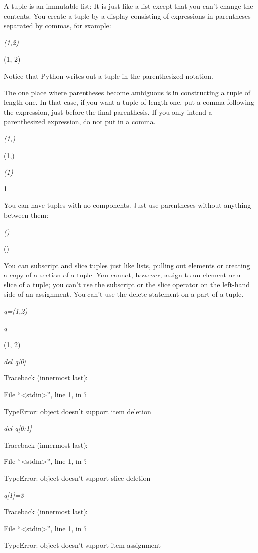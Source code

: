 A tuple is an immutable list: It is
just like a list except that you can't change the contents. You create a
tuple by a display consisting of expressions in parentheses separated by
commas, for example:


\emph{(1,2)}

(1, 2)

Notice that Python writes out a
tuple in the parenthesized notation.

The one place where parentheses
become ambiguous is in constructing a tuple of length one. In that case,
if you want a tuple of length one, put a comma following the expression,
just before the final parenthesis. If you only intend a parenthesized
expression, do not put in a comma.


\emph{(1,)}

(1,)


\emph{(1)}

1

You can have tuples with no
components. Just use parentheses without anything between them:


\emph{()}

()

You can subscript and slice tuples
just like lists, pulling out elements or creating a copy of a section of
a tuple. You cannot, however, assign to an element or a slice of a
tuple; you can't use the subscript or the slice operator on the
left-hand side of an assignment. You can't use the delete statement on a
part of a tuple.


\emph{q=(1,2)}


\emph{q}

(1, 2)


\emph{del q{[}0{]}}

Traceback (innermost last):

 File
``\textless{}stdin\textgreater{}'', line 1, in ?

TypeError: object doesn't support
item deletion


\emph{del q{[}0:1{]}}

Traceback (innermost last):

 File
``\textless{}stdin\textgreater{}'', line 1, in ?

TypeError: object doesn't support
slice deletion


\emph{q{[}1{]}=3}

Traceback (innermost last):

 File
``\textless{}stdin\textgreater{}'', line 1, in ?

TypeError: object doesn't support
item assignment


